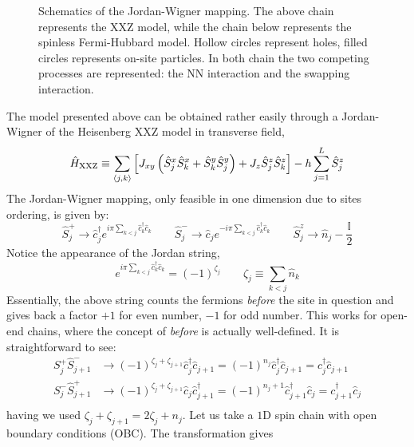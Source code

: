 \begin{figure}
	\centering
	
	\caption{Schematics of the Jordan-Wigner mapping. The above chain represents the $\mathrm{XXZ}$ model, while the chain below represents the spinless Fermi-Hubbard model. Hollow circles represent holes, filled circles represents on-site particles. In both chain the two competing processes are represented: the NN interaction and the swapping interaction.}
	\label{fig:jordan-wigner-mapping}
\end{figure}

The model presented above can be obtained rather easily through a Jordan-Wigner of the Heisenberg XXZ model in transverse field,
\begin{equation}\label{eq:xxz-hamiltonian}
	\hat H_\mathrm{XXZ} \equiv \sum_{\ev{j,k}} \left[
		J_{xy} \left( 
			\hat S_j^x \hat S_k^x + \hat S_k^y \hat S_j^y
		\right) + J_z \hat S_j^z \hat S_k^z
	\right] - h \sum_{j=1}^L \hat S_j^z 
\end{equation}
The Jordan-Wigner mapping, only feasible in one dimension due to sites ordering, is given by:
\[
	\hat S_j^+ \to \hat c_j^\dagger e^{i\pi \sum_{k < j} \hat c_k^\dagger \hat c_k}
	\qquad
	\hat S_j^- \to \hat c_j e^{- i\pi \sum_{k < j} \hat c_k^\dagger \hat c_k}
	\qquad
	\hat S_j^z \to \hat n_j - \frac{\mathbb{I}}{2}
\]
Notice the appearance of the Jordan string,
\[
	e^{i\pi \sum_{k < j} \hat c_k^\dagger \hat c_k} = (-1)^{\zeta_j}
	\qquad
	\zeta_j \equiv \sum_{k < j} \hat n_k
\]
Essentially, the above string counts the fermions \textit{before} the site in question and gives back a factor $+1$ for even number, $-1$ for odd number. This works for open-end chains, where the concept of \textit{before} is actually well-defined. It is straightforward to see:
\[
	\begin{aligned}
		S_j^+ \hat S_{j+1}^- &\to (-1)^{\zeta_j + \zeta_{j+1}} \hat c_j^\dagger \hat c_{j+1} = (-1)^{n_j} \hat c_j^\dagger \hat c_{j+1} = c_j^\dagger \hat c_{j+1} \\
		S_j^- \hat S_{j+1}^+ &\to (-1)^{\zeta_j + \zeta_{j+1}} \hat c_j \hat c_{j+1}^\dagger = (-1)^{n_j+1} \hat c_{j+1}^\dagger \hat c_j = c_{j+1}^\dagger \hat c_j \\
	\end{aligned}
\]
having we used $\zeta_j + \zeta_{j+1} = 2 \zeta_j + n_j$.
Let us take a $1\mathrm{D}$ spin chain with open boundary conditions (OBC). The transformation gives
